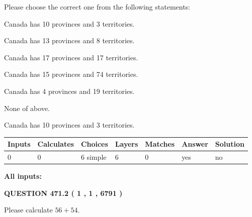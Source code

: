 \documentclass[12pt]{article}
\begin{document}
  
Please choose the correct one from the following statements:
 
 
Canada has 10  provinces and 3 territories.
 
 
Canada has  13 provinces and  8 territories.
 
 
Canada has  17 provinces and  17 territories.
 
 
Canada has  15 provinces and  74 territories.
 
 
Canada has   4 provinces and  19 territories.
 
 
 None of above.
 
 
\noindent{}
 
 
Canada has 10  provinces and 3 territories.
 
 
\noindent{}
 
 
   
   
   
   
\noindent\begin{tabular}{|l|l|l|l|l|l|l|}
 \hline
Inputs & Calculates & Choices & Layers & Matches & Answer & Solution \\ \hline
 0  & 
 0  & 
 6
  simple  
  & 
 6  & 
 0  & 
  yes & 
  no 
  \\ \hline
 \end{tabular}
   
   
   
   
\noindent{}
   
   
   
   
\noindent\vspace{0.1in}\hspace{-0.08in} {\textbf{\Large{All inputs: }}}
   
   
  
\vspace{0.2in}
  
{\textbf{\Large{QUESTION
471.2 
 ( 1 , 1 , 6791 )
}}}
  
  
 
Please calculate $ %
56 +  %
54 $.
 
 
   
\end{document}
